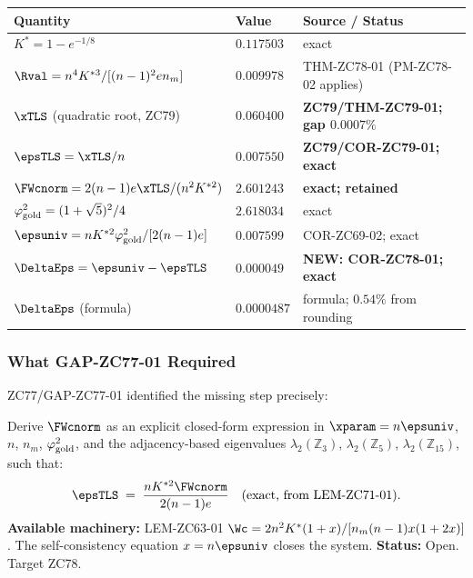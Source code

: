 \documentclass[12pt, a4paper]{article}
\begin{document}
\begin{keybox}[title={Numerical Summary --- ZC78 (T-canonical)}]
{\small\renewcommand{\arraystretch}{1.25}
\begin{center}
\begin{tabular}{@{}p{5.5cm}p{2.3cm}p{4.2cm}@{}}
\toprule
\textbf{Quantity} & \textbf{Value} & \textbf{Source / Status} \\
\midrule
$K^* = 1 - e^{-1/8}$                    & $0.117503$ & exact \\
$\Rval = n^4 K^{*3}/[(n-1)^2 e n_m]$   & $0.009978$ & THM-ZC78-01 (PM-ZC78-02 applies) \\
$\xTLS$ (quadratic root, ZC79)          & $0.060400$ & \textbf{ZC79/THM-ZC79-01; gap $0.0007\%$} \\
$\epsTLS = \xTLS/n$                      & $0.007550$ & \textbf{ZC79/COR-ZC79-01; exact} \\
$\FWcnorm = 2(n-1)e\xTLS/(n^2 K^{*2})$ & $2.601243$ & \textbf{exact; retained} \\
$\varphi_{\rm gold}^2 = (1+\sqrt{5})^2/4$ & $2.618034$ & exact \\
$\epsuniv = n K^{*2}\varphi_{\rm gold}^2/[2(n-1)e]$
                                          & $0.007599$ & COR-ZC69-02; exact \\
$\DeltaEps = \epsuniv - \epsTLS$         & $0.000049$ & \textbf{NEW: COR-ZC78-01; exact} \\
$\DeltaEps$ (formula)                    & $0.0000487$ & formula; $0.54\%$ from rounding \\
\bottomrule
\end{tabular}
\end{center}}
\end{keybox}

\subsubsection{What GAP-ZC77-01 Required}

ZC77/GAP-ZC77-01 identified the missing step precisely:

\begin{keybox}[title={GAP-ZC77-01 Statement (verbatim from ZC77)}]
Derive $\FWcnorm$ as an explicit closed-form expression in
$\xparam = n\epsuniv$, $n$, $n_m$, $\varphi_{\rm gold}^2$,
and the adjacency-based eigenvalues $\lambda_2(\mathbb{Z}_3)$,
$\lambda_2(\mathbb{Z}_5)$, $\lambda_2(\mathbb{Z}_{15})$,
such that:
\[
  \epsTLS \;=\; \frac{n K^{*2} \FWcnorm}{2(n-1)e}
  \quad\text{(exact, from LEM-ZC71-01)}.
\]
\textbf{Available machinery:} LEM-ZC63-01
$\Wc = 2n^2 K^*(1+x)/[n_m(n-1)x(1+2x)]$.
The self-consistency equation $x = n\epsuniv$ closes the system.
\textbf{Status:} Open. Target ZC78.
\end{keybox}
\end{document}
